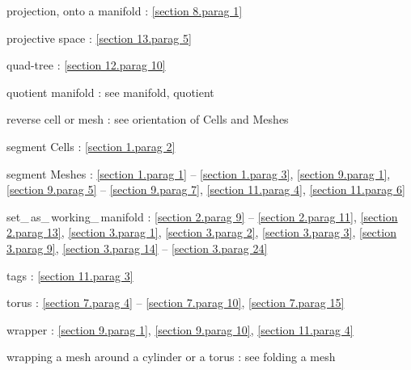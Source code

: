 \documentclass[a4paper]{scrreprt}
\def\numb{}
\newcommand\verm[1]{\textcolor{manif}{#1}}
\renewcommand\tt{\normalfont\ttfamily}
\begin{document}
\noindent
projection, onto a manifold :
\ref{\numb section 8.\numb parag 1}

\noindent
projective space : \ref{\numb section 13.\numb parag 5}

\noindent
quad-tree : \ref{\numb section 12.\numb parag 10}

\noindent
quotient manifold : see manifold, quotient

\noindent
reverse cell or mesh : see orientation of {\small\tt \verm{Cell}}s and {\small\tt \verm{Mesh}}es

\noindent
segment {\small\tt \verm{Cell}}s : \ref{\numb section 1.\numb parag 2}

\noindent
segment {\small\tt \verm{Mesh}}es :
\ref{\numb section 1.\numb parag 1} -- \ref{\numb section 1.\numb parag 3},
\ref{\numb section 9.\numb parag 1}, \ref{\numb section 9.\numb parag 5} --
\ref{\numb section 9.\numb parag 7}, \ref{\numb section 11.\numb parag 4},
\ref{\numb section 11.\numb parag 6}

\noindent
{\small\tt set\_\,as\_\,working\_\,manifold} :
\ref{\numb section 2.\numb parag 9} -- \ref{\numb section 2.\numb parag 11},
\ref{\numb section 2.\numb parag 13}, \ref{\numb section 3.\numb parag 1},
\ref{\numb section 3.\numb parag 2}, \ref{\numb section 3.\numb parag 3},
\ref{\numb section 3.\numb parag 9},
\ref{\numb section 3.\numb parag 14} -- \ref{\numb section 3.\numb parag 24}

\noindent
{\small\tt\verm{tag}}s : \ref{\numb section 11.\numb parag 3}

\noindent
torus : \ref{\numb section 7.\numb parag 4} -- \ref{\numb section 7.\numb parag 10},
\ref{\numb section 7.\numb parag 15}

\noindent
wrapper : \ref{\numb section 9.\numb parag 1}, \ref{\numb section 9.\numb parag 10},
\ref{\numb section 11.\numb parag 4}

\noindent
wrapping a mesh around a cylinder or a torus : see folding a mesh
\end{document}
